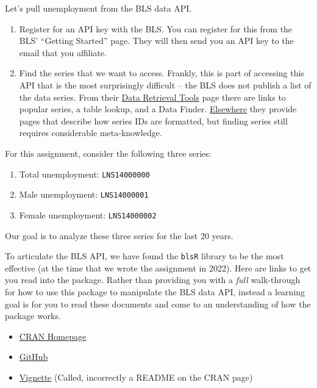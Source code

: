 \documentclass[
]{article}
\providecommand{\tightlist}{%
  \setlength{\itemsep}{0pt}\setlength{\parskip}{0pt}}
\begin{document}
Let's pull unemployment from the BLS data API.

\begin{enumerate}
\def\labelenumi{\arabic{enumi}.}
\tightlist
\item
  Register for an API key with the BLS. You can register for this from
  the BLS' ``Getting Started'' page. They will then send you an API key
  to the email that you affiliate.
\item
  Find the series that we want to access. Frankly, this is part of
  accessing this API that is the most surprisingly difficult -- the BLS
  does not publish a list of the data series. From their
  \href{https://www.bls.gov/data/tools.htm}{Data Retrieval Tools} page
  there are links to popular series, a table lookup, and a Data Finder.
  \href{https://www.bls.gov/help/hlpforma.htm\#OEUS}{Elsewhere} they
  provide pages that describe how series IDs are formatted, but finding
  series still requires considerable meta-knowledge.
\end{enumerate}

For this assignment, consider the following three series:

\begin{enumerate}
\def\labelenumi{\arabic{enumi}.}
\tightlist
\item
  Total unemployment: \texttt{LNS14000000}
\item
  Male unemployment: \texttt{LNS14000001}
\item
  Female unemployment: \texttt{LNS14000002}
\end{enumerate}

Our goal is to analyze these three series for the last 20 years.

To articulate the BLS API, we have found the \texttt{blsR} library to be
the most effective (at the time that we wrote the assignment in 2022).
Here are links to get you read into the package. Rather than providing
you with a \emph{full} walk-through for how to use this package to
manipulate the BLS data API, instead a learning goal is for you to read
these documents and come to an understanding of how the package works.

\begin{itemize}
\tightlist
\item
  \href{https://cran.r-project.org/web/packages/blsR/index.html}{CRAN
  Homepage}
\item
  \href{https://github.com/groditi/blsR}{GitHub}
\item
  \href{https://cran.r-project.org/web/packages/blsR/readme/README.html}{Vignette}
  (Called, incorrectly a README on the CRAN page)
\end{itemize}
\end{document}
